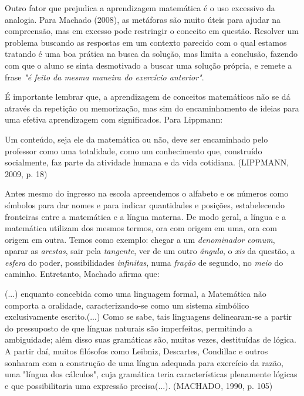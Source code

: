 \documentclass[brasil]{abnt}
\begin{document}
    Outro fator que prejudica a aprendizagem matemática é o uso excessivo da analogia. Para Machado (2008), as metáforas são muito úteis para ajudar na compreensão, mas em excesso pode restringir o
    conceito em questão. Resolver um problema buscando as respostas em um contexto parecido com o qual estamos tratando é uma boa prática na busca da solução, mas limita a conclusão, fazendo com que o
    aluno se sinta desmotivado a buscar uma solução própria, e remete a frase \textit{"é feito da mesma maneira do exercício anterior"}.   
    
    É importante lembrar que, a aprendizagem de conceitos matemáticos não se dá através da repetição ou memorização, mas sim do encaminhamento de ideias para uma efetiva aprendizagem com significados. 
    Para Lippmann:
		\begin{citacao} Um conteúdo, seja ele da matemática ou não, deve ser encaminhado pelo professor como uma totalidade, como um conhecimento que, construído socialmente, faz parte da atividade humana e
						da vida cotidiana. (LIPPMANN, 2009, p. 18)
		\end{citacao} 
		
	Antes mesmo do ingresso na escola apreendemos o alfabeto e os números como símbolos para dar nomes e para indicar quantidades 
	e posições, estabelecendo fronteiras entre a matemática e a língua materna. De modo geral, a língua e a matemática utilizam dos mesmos termos, 
	ora com origem em uma, ora com origem em outra. Temos como exemplo: chegar a um \textit{denominador comum}, aparar as \textit{arestas}, sair pela \textit{tangente}, 
	ver de um outro \textit{ângulo}, o \textit{xis} da questão, a \textit{esfera} do poder, possibilidades \textit{infinitas}, numa \textit{fração} de segundo, no \textit{meio} do caminho.
	Entretanto, Machado afirma que:
	 
		\begin{citacao}(...) enquanto concebida como uma linguagem formal, a Matemática não comporta a oralidade, caracterizando-se como um sistema simbólico exclusivamente escrito.(...) 
						Como se sabe, tais linguagens delinearam-se a partir do pressuposto de que línguas naturais são imperfeitas, permitindo a ambiguidade; além disso suas gramáticas são, muitas vezes, 
						destituídas de lógica. A partir daí, muitos filósofos como Leibniz, Descartes, Condillac e outros sonharam com a construção de uma língua adequada para exercício da razão, uma "língua 
						dos cálculos", cuja gramática teria características plenamente lógicas e que possibilitaria uma expressão precisa(...). (MACHADO, 1990, p. 105)
		\end{citacao}
		
\end{document}
